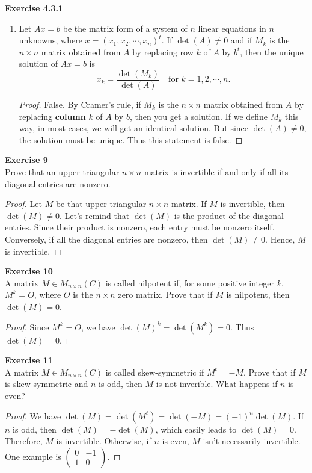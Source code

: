 \documentclass[12pt, a4paper]{article}
\theoremstyle{plain}
\newenvironment{exercise}[2][Exercise]
    { \begin{mdframed}[backgroundcolor=gray!20] \textbf{#1 #2} \\}
    {  \end{mdframed}}
\begin{document}
\begin{exercise}{4.3.1}
\begin{enumerate}[label=(\roman*)]
	\item Let $Ax=b$ be the matrix form of a system of $n$ linear equations in $n$ unknowns, where $x=(x_1,x_2,\cdots ,x_n)^t$. If $\det(A)\neq 0$ and if $M_k$ is the $n\times n$ matrix obtained from $A$ by replacing row $k$ of $A$ by $b^t$, then the unique solution of $Ax=b$ is 
	\[
	x_k=\frac{\det(M_k)}{\det(A)}\quad \text{for $k=1,2,\cdots ,n.$}
	\]
	\begin{proof}
	False. By Cramer's rule, if $M_k$ is the $n\times n$ matrix obtained from $A$ by replacing \textbf{column} $k$ of $A$ by $b$, then you get a solution. If we define $M_k$ this way, in most cases, we will get an identical solution. But since $\det(A)\neq 0$, the solution must be unique. Thus this statement is false.
	\end{proof}
	\end{enumerate}
\end{exercise}

\begin{exercise}{9}
Prove that an upper triangular $n\times n$ matrix is invertible if and only if all its diagonal entries are nonzero.
\end{exercise}
	\begin{proof}
	Let $M$ be that upper triangular $n\times n$ matrix. If $M$ is invertible, then $\det(M)\neq 0$. Let's remind that $\det(M)$ is the product of the diagonal entries. Since their product is nonzero, each entry must be nonzero itself. Conversely, if all the diagonal entries are nonzero, then $\det(M)\neq 0$. Hence, $M$ is invertible.
	\end{proof}
	
\begin{exercise}{10}
A matrix $M\in M_{n\times n}(C)$ is called nilpotent if, for some positive integer $k$, $M^k=O$, where $O$ is the $n\times n$ zero matrix. Prove that if $M$ is nilpotent, then $\det(M)=0$. 
\end{exercise}
	\begin{proof}
	Since $M^k=O$, we have $\det(M)^k=\det(M^k)=0$. Thus $\det(M)=0$.
	\end{proof}
	
\begin{exercise}{11}
A matrix $M\in M_{n\times n}(C)$ is called skew-symmetric if $M^t=-M$. Prove that if $M$ is skew-symmetric and $n$ is odd, then $M$ is not inverible. What happens if $n$ is even? 
\end{exercise}
	\begin{proof}
	We have $\det(M)=\det(M^t)=\det(-M)=(-1)^n\det(M)$. If $n$ is odd, then $\det(M)=-\det(M)$, which easily leads to $\det(M)=0$. Therefore, $M$ is invertible. Otherwise, if $n$ is even, $M$ isn't necessarily invertible. One example is 
	$\begin{pmatrix}
	0&-1\\
	1&0
	\end{pmatrix}$.
	\end{proof}
	
\end{document}
